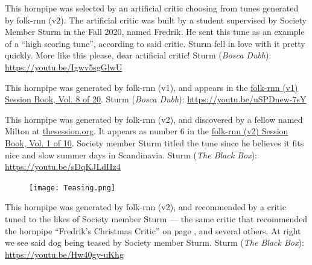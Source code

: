 \documentclass[a4paper,notitlepage,twoside]{book}
\begin{document}
{}\label{hornpipe:FredriksChristmasCritic}
\hypertarget{hornpipe:FredriksChristmasCritic}{}
This hornpipe was selected by an artificial critic choosing from tunes generated by folk-rnn (v2). The artificial critic was built by a student supervised by Society Member Sturm in the Fall 2020, named Fredrik. He sent  this tune as an example of a ``high scoring tune'', according to said critic. Sturm fell in love with it pretty quickly. More like this please, dear artificial critic! Sturm ({\em Bosca Dubh}): \url{https://youtu.be/Igwv5sgGlwU}

{}  
  
\hypertarget{hornpipe:SorpikesCat}{}
This hornpipe was generated by folk-rnn (v1), and
appears in the \href{https://highnoongmt.wordpress.com/2018/01/05/volumes-1-20-of-folk-rnn-v1-transcriptions}{folk-rnn (v1) Session Book, Vol. 8 of 20}.
Sturm ({\em Bosca Dubh}): \url{https://youtu.be/uSPDnew-7sY}

{}  
  
\hypertarget{hornpipe:SocksandSandals}{}
This hornpipe was generated by folk-rnn (v2), and
discovered by a fellow named Milton at \href{https://thesession.org/discussions/40416}{thesession.org}.
It appears as number 6 in the \href{https://highnoongmt.wordpress.com/2018/01/05/volumes-1-20-of-folk-rnn-v1-transcriptions}{folk-rnn (v2) Session Book, Vol. 1 of 10}.
Society member Sturm titled the tune since he believes it fits
nice and slow summer days in Scandinavia.
Sturm ({\em The Black Box}): \url{https://youtu.be/sDqKJLdIIz4}

{}  
  
\hypertarget{hornpipe:TeasetheDog}{}
\begin{figure}
\texttt{[image: Teasing.png]}
\end{figure}
This hornpipe was generated by folk-rnn (v2), 
and recommended by a critic tuned to the likes of 
Society member Sturm --- the same critic that recommended
the hornpipe ``Fredrik's Christmas Critic'' on page \pageref{hornpipe:FredriksChristmasCritic},
and several others.
At right we see said dog being teased by Society member Sturm.
Sturm ({\em The Black Box}): \url{https://youtu.be/Hw40gy-uKhg}
\end{document}
